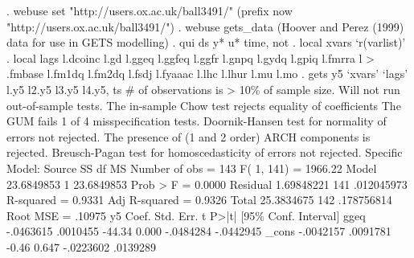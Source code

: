 {\smallskip}
. webuse set "http://users.ox.ac.uk/{\tytilde}ball3491/"
(prefix now "http://users.ox.ac.uk/{\tytilde}ball3491/")
{\smallskip}
. webuse gets_data
(Hoover and Perez (1999) data for use in GETS modelling)
{\smallskip}
. qui ds y* u* time, not
{\smallskip}
. local xvars `r(varlist)' 
{\smallskip}
. local lags l.dcoinc l.gd l.ggeq l.ggfeq l.ggfr l.gnpq l.gydq l.gpiq l.fmrra l
> .fmbase l.fm1dq l.fm2dq l.fsdj l.fyaaac l.lhc l.lhur l.mu l.mo 
{\smallskip}
. gets y5 `xvars' `lags' l.y5 l2.y5 l3.y5 l4.y5, ts
\# of observations is > 10\% of sample size.  Will not run out-of-sample tests.
The in-sample Chow test rejects equality of coefficients
{\smallskip}
The GUM fails 1 of 4 misspecification tests.  Doornik-Hansen test for normality
 of errors not rejected.  The presence of (1 and 2 order) ARCH components is
 rejected. Breusch-Pagan test for homoscedasticity of errors not rejected.
{\smallskip}
{\smallskip}
Specific Model:
{\smallskip}
{\smallskip}
      Source {\VBAR}       SS       df       MS              Number of obs =     143
           F(  1,   141) = 1966.22
       Model {\VBAR}  23.6849853     1  23.6849853           Prob > F      =  0.0000
    Residual {\VBAR}  1.69848221   141  .012045973           R-squared     =  0.9331
           Adj R-squared =  0.9326
       Total {\VBAR}  25.3834675   142  .178756814           Root MSE      =  .10975
{\smallskip}
          y5 {\VBAR}      Coef.   Std. Err.      t    P>|t|     [95\% Conf. Interval]
        ggeq {\VBAR}  -.0463615   .0010455   -44.34   0.000    -.0484284   -.0442945
       _cons {\VBAR}  -.0042157   .0091781    -0.46   0.647    -.0223602    .0139289

